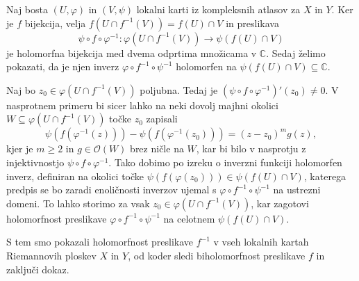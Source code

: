 \documentclass[mat1]{fmfdelo}
\numberwithin{equation}{section}
\newcommand{\C}{\mathbb C}
\newcommand{\inv}{^{-1}}
\newcommand{\hol}[1]{\mathcal{O}(#1)}
\theoremstyle{definition}
\begin{document}
\begin{dokaz}
    Naj bosta $(U, \varphi)$ in $(V, \psi)$ lokalni karti iz kompleksnih atlasov za $X$ in $Y$.
    Ker je $f$ bijekcija, velja $f(U \cap f\inv(V)) = f(U) \cap V$ in preslikava 
    \[
        \psi \circ f \circ \varphi\inv : \varphi(U \cap f\inv(V)) \to \psi(f(U) \cap V)  
    \]
    je holomorfna bijekcija med dvema odprtima množicama v $\C$. Sedaj želimo pokazati, da je njen inverz $\varphi \circ f\inv \circ \psi\inv$ holomorfen na $\psi(f(U) \cap V) \subseteq \C$.

    Naj bo $z_0 \in \varphi(U \cap f\inv(V))$ poljubna. Tedaj je $(\psi \circ f \circ \varphi\inv)'(z_0) \neq 0$. V nasprotnem primeru bi sicer lahko na neki dovolj majhni okolici $W \subseteq \varphi(U \cap f\inv(V))$ točke $z_0$ zapisali 
    \[
        \psi(f(\varphi\inv(z))) - \psi(f(\varphi\inv(z_0))) = (z - z_0)^m g(z),
    \]
    kjer je $m \geq 2$ in $g \in \hol{W}$ brez ničle na $W$, %
    kar bi bilo v nasprotju z injektivnostjo $\psi \circ f \circ \varphi\inv$. Tako dobimo po izreku o inverzni funkciji \cite[Izrek 67]{Globevnik} holomorfen inverz, definiran na okolici točke $\psi(f(\varphi(z_0))) \in \psi(f(U) \cap V)$, katerega predpis se bo zaradi enoličnosti inverzov ujemal s $\varphi \circ f\inv \circ \psi\inv$ na ustrezni domeni. To lahko storimo za vsak $z_0 \in \varphi(U \cap f\inv(V))$, kar zagotovi holomorfnost preslikave $\varphi \circ f\inv \circ \psi\inv$ %
    na celotnem $\psi(f(U) \cap V)$. 
    
    S tem smo pokazali holomorfnost preslikave $f\inv$ v vseh lokalnih kartah Riemannovih ploskev $X$ in $Y$, od koder sledi biholomorfnost preslikave $f$ in zaključi dokaz. 
\end{dokaz}
\end{document}
